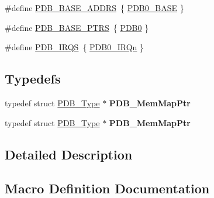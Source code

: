 \begin{DoxyCompactItemize}
\item 
\#define \hyperlink{group__PDB__Peripheral__Access__Layer_ga2aac97276b35cabb3a49413841a8bbe2}{P\+D\+B\+\_\+\+B\+A\+S\+E\+\_\+\+A\+D\+D\+RS}~\{ \hyperlink{group__PDB__Peripheral__Access__Layer_gaca699dde276786b0443ef728ae1f01c0}{P\+D\+B0\+\_\+\+B\+A\+SE} \}
\item 
\#define \hyperlink{group__PDB__Peripheral__Access__Layer_ga6dce940c99da63282b1d28f65ed75293}{P\+D\+B\+\_\+\+B\+A\+S\+E\+\_\+\+P\+T\+RS}~\{ \hyperlink{group__PDB__Peripheral__Access__Layer_ga91cdd5c74efea207fd5cf60bb271b90c}{P\+D\+B0} \}
\item 
\#define \hyperlink{group__PDB__Peripheral__Access__Layer_ga8e897cb723b12765718d641d60409ce3}{P\+D\+B\+\_\+\+I\+R\+QS}~\{ \hyperlink{group__Interrupt__vector__numbers_gga666eb0caeb12ec0e281415592ae89083a88267c4e978fd991b88267fccba49c70}{P\+D\+B0\+\_\+\+I\+R\+Qn} \}
\end{DoxyCompactItemize}
\subsection*{Typedefs}
\begin{DoxyCompactItemize}
\item 
typedef struct \hyperlink{structPDB__Type}{P\+D\+B\+\_\+\+Type} $\ast$ {\bfseries P\+D\+B\+\_\+\+Mem\+Map\+Ptr}\hypertarget{group__PDB__Peripheral__Access__Layer_ga307cfc08b382a95ae86e5422472caeeb}{}\label{group__PDB__Peripheral__Access__Layer_ga307cfc08b382a95ae86e5422472caeeb}

\item 
typedef struct \hyperlink{structPDB__Type}{P\+D\+B\+\_\+\+Type} $\ast$ {\bfseries P\+D\+B\+\_\+\+Mem\+Map\+Ptr}\hypertarget{group__PDB__Peripheral__Access__Layer_ga307cfc08b382a95ae86e5422472caeeb}{}\label{group__PDB__Peripheral__Access__Layer_ga307cfc08b382a95ae86e5422472caeeb}

\end{DoxyCompactItemize}


\subsection{Detailed Description}


\subsection{Macro Definition Documentation}
